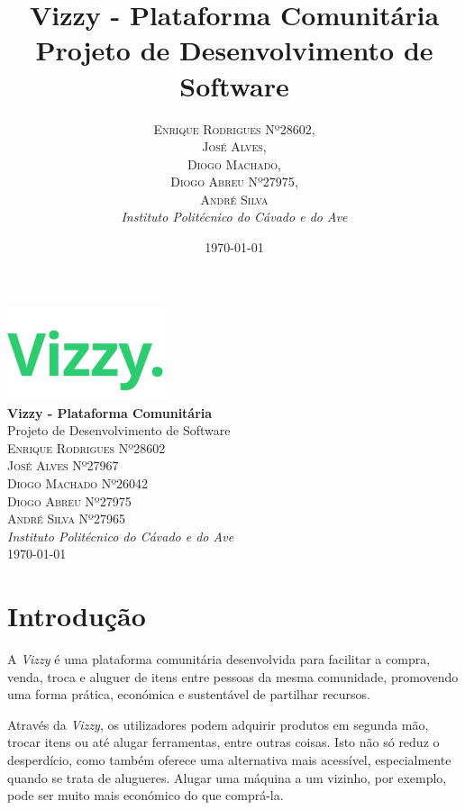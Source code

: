 \documentclass[a4paper, 12pt]{article} %
\title{\textbf{Vizzy - Plataforma Comunitária}\\ %
	Projeto de Desenvolvimento de Software} %
\author{
	\textsc{Enrique Rodrigues Nº28602}, \\
	\textsc{José Alves}, \\
	\textsc{Diogo Machado}, \\
	\textsc{Diogo Abreu Nº27975}, \\ 
	\textsc{André Silva} \\
	\textit{Instituto Politécnico do Cávado e do Ave}
}
\date{\today} %
\renewcommand{\maketitle}{
\begin{titlepage}
    \begin{center}
        \vspace*{1cm}
        \includegraphics[width=0.35\textwidth]{../images/logo-no-bg.png}\\[1cm] %
        {\Huge\textbf{Vizzy - Plataforma Comunitária}}\\[0.5cm] %
        {\Large Projeto de Desenvolvimento de Software}\\[2cm] %
        {\large \textsc{
        Enrique Rodrigues Nº28602 \\
        José Alves Nº27967 \\
        Diogo Machado Nº26042 \\
        Diogo Abreu Nº27975 \\
        André Silva Nº27965}}\\[0.5cm] %
        {\textit{Instituto Politécnico do Cávado e do Ave}}\\[1.5cm] %
        {\large \today} %
        \vfill
    \end{center}
\end{titlepage}
}
\begin{document}
\maketitle %







\newpage
\section{Introdução}

A \textit{Vizzy} é uma plataforma comunitária desenvolvida para facilitar a compra, venda, troca e aluguer de itens entre pessoas da mesma comunidade, promovendo uma forma prática, económica e sustentável de partilhar recursos.

Através da \textit{Vizzy}, os utilizadores podem adquirir produtos em segunda mão, trocar itens ou até alugar ferramentas, entre outras coisas. Isto não só reduz o desperdício, como também oferece uma alternativa mais acessível, especialmente quando se trata de alugueres. Alugar uma máquina a um vizinho, por exemplo, pode ser muito mais económico do que comprá-la.
\end{document}
